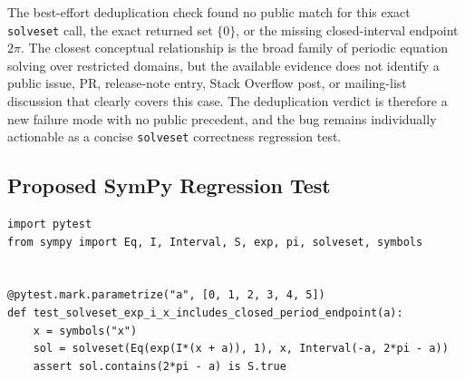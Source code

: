 \documentclass[11pt]{article}
\begin{document}
The best-effort deduplication check found no public match for this exact
\texttt{solveset} call, the exact returned set \(\{0\}\), or the missing
closed-interval endpoint \(2\pi\).  The closest conceptual relationship is the
broad family of periodic equation solving over restricted domains, but the
available evidence does not identify a public issue, PR, release-note entry,
Stack Overflow post, or mailing-list discussion that clearly covers this case.
The deduplication verdict is therefore a new failure mode with no public
precedent, and the bug remains individually actionable as a concise
\texttt{solveset} correctness regression test.

\subsection{Proposed SymPy Regression Test}

\medskip

\begin{lstlisting}[style=bugpython]
import pytest
from sympy import Eq, I, Interval, S, exp, pi, solveset, symbols


@pytest.mark.parametrize("a", [0, 1, 2, 3, 4, 5])
def test_solveset_exp_i_x_includes_closed_period_endpoint(a):
    x = symbols("x")
    sol = solveset(Eq(exp(I*(x + a)), 1), x, Interval(-a, 2*pi - a))
    assert sol.contains(2*pi - a) is S.true
\end{lstlisting}
\end{document}
